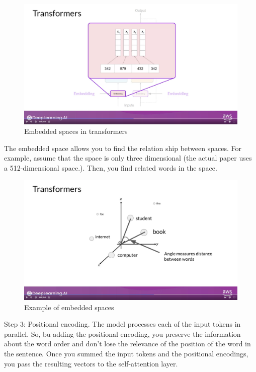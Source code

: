 \documentclass[12pt]{report}
\begin{document}
\begin{figure}[H]
  \centering
  \caption{Embedded spaces in transformers}
  \includegraphics[scale=0.2]{pics/embeddedSpace.png}
\end{figure}

The embedded space allows you to find the relation ship between spaces. For example, assume that the space is only three dimensional (the actual paper uses a 512-dimensional space.). Then, you find related words in the space.


\begin{figure}[H]
  \centering
  \caption{Example of embedded spaces}
  \includegraphics[scale=0.2]{pics/exEmbedSpace.png}
\end{figure}


Step 3: Positional encoding. The model processes each of the input tokens in parallel. So, bu adding the positional encoding, you preserve the information about the word order and don't lose the relevance of the position of the word in the sentence. Once you summed the input tokens and the positional encodings, you pass the resulting vectors to the self-attention layer.
\end{document}

